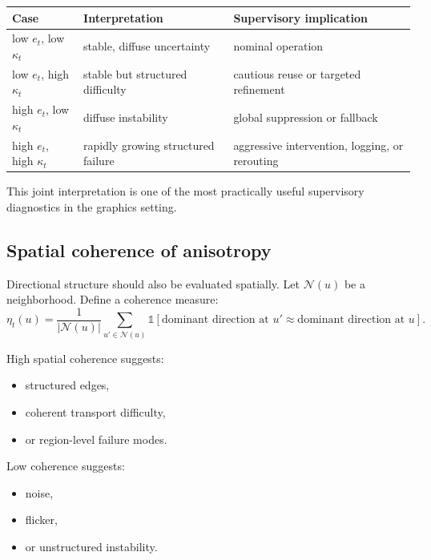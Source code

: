 \documentclass[11pt]{article}
\theoremstyle{definition}
\theoremstyle{plain}
\begin{document}
\begin{center}
\begin{tabular}{lll}
\toprule
Case & Interpretation & Supervisory implication \\
\midrule
low $e_t$, low $\kappa_t$ & stable, diffuse uncertainty & nominal operation \\
low $e_t$, high $\kappa_t$ & stable but structured difficulty & cautious reuse or targeted refinement \\
high $e_t$, low $\kappa_t$ & diffuse instability & global suppression or fallback \\
high $e_t$, high $\kappa_t$ & rapidly growing structured failure & aggressive intervention, logging, or rerouting \\
\bottomrule
\end{tabular}
\end{center}

This joint interpretation is one of the most practically useful supervisory diagnostics in the graphics setting.


\subsection{Spatial coherence of anisotropy}

Directional structure should also be evaluated spatially. Let $\mathcal{N}(u)$ be a neighborhood. Define a coherence measure:
\begin{equation}
\eta_t(u)=\frac{1}{|\mathcal{N}(u)|}\sum_{u'\in\mathcal{N}(u)}
\mathbb{1}\!\left[
\text{dominant direction at }u' \approx \text{dominant direction at }u
\right].
\end{equation}

High spatial coherence suggests:
\begin{itemize}[leftmargin=1.5em]
    \item structured edges,
    \item coherent transport difficulty,
    \item or region-level failure modes.
\end{itemize}

Low coherence suggests:
\begin{itemize}[leftmargin=1.5em]
    \item noise,
    \item flicker,
    \item or unstructured instability.
\end{itemize}
\end{document}
